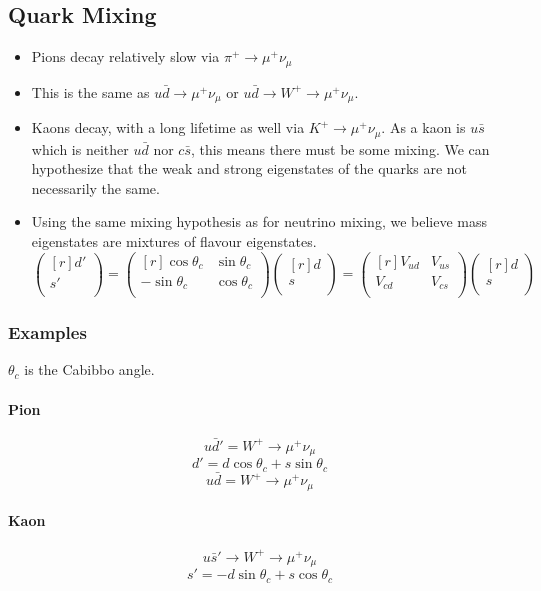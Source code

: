 \subsection{Quark Mixing}
\begin{itemize}
  \item Pions decay relatively slow via $π^{+} → μ^{+} ν_{μ}$
  \item This is the same as $u \bar{d} → μ^{+} ν_{μ}$ or $u \bar{d} → W^{+} → μ^{+} ν_{μ}$. 
  \item Kaons decay, with a long lifetime as well via $K^{+} →  μ^{+} ν_{μ}$. As a kaon is $u \bar{s}$ which is neither $u \bar{d}$ nor $c\bar{s}$, this means there must be some mixing. We can hypothesize that the weak and strong eigenstates of the quarks are not necessarily the same. 
  \item Using the same mixing hypothesis as for neutrino mixing, we believe mass eigenstates are mixtures of flavour eigenstates. 
  \begin{equation}
    \begin{pmatrix*}[r]
     d' \\
     s' \\
    \end{pmatrix*}  = 
    \begin{pmatrix*}[r]
      \cos θ_c & \sin θ_c \\
      -\sin θ_c & \cos θ_c \\
    \end{pmatrix*}
    \begin{pmatrix*}[r]
      d \\
      s \\
    \end{pmatrix*} = 
    \begin{pmatrix*}[r]
     V_{ud} & V_{us} \\
     V_{cd} & V_{cs} \\
    \end{pmatrix*} 
    \begin{pmatrix*}[r]
      d \\
      s \\  
    \end{pmatrix*}
  \end{equation}
\end{itemize}
\subsubsection{Examples}
$θ_{c}$ is the Cabibbo angle.
\paragraph{Pion}
\begin{equation}
u \bar{d}' = W^{+} → μ^{+} ν_{μ}
\end{equation}
\begin{equation}
  d' = d \cos θ_c + s \sin θ_c
\end{equation}
\begin{equation}
  u \bar{d} = W^{+} → μ^{+} ν_{μ}
\end{equation}
\paragraph{Kaon}
\begin{equation}
  u \bar{s}' → W^{+} → μ^{+} ν_{μ}
\end{equation}
\begin{equation}
  s' = -d \sin θ_c + s \cos θ_c
\end{equation}